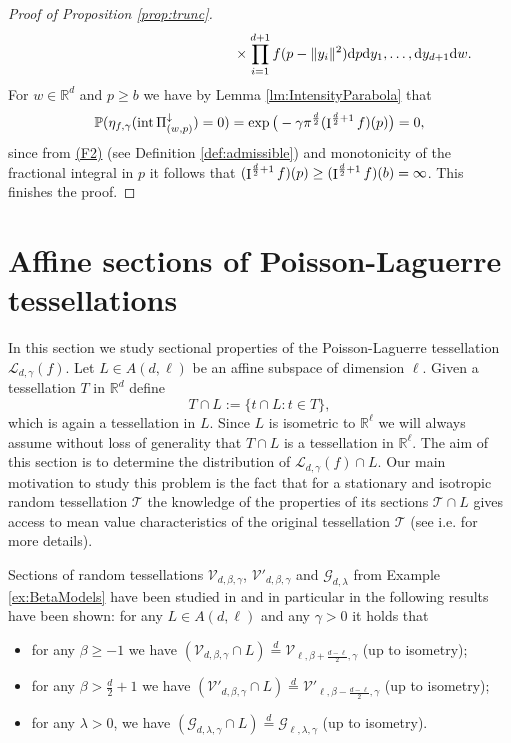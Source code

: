 \documentclass[11pt,a4paper]{article}
\theoremstyle{plain}
\theoremstyle{definition}
\theoremstyle{remark}
\def\PP{\mathbb{P}}
\def\RR{\mathbb{R}}
\def\cG{\mathcal{G}}
\def\cL{\mathcal{L}}
\def\cT{\mathcal{T}}
\def\cV{\mathcal{V}}
\newcommand{\dd}{{\rm d}}
\newcommand{\frI}{\mathop{\mathrm{I}}\nolimits}
\newcommand{\inter}{\operatorname{int}}
\begin{document}
\begin{proof}[Proof of Proposition \ref{prop:trunc}]
\begin{align*}
    &\hspace{5cm}\times\prod_{i=1}^{d+1}f(p-\|y_i\|^2)\dd p \dd y_1,\dots,\dd y_{d+1}\dd w.
\end{align*}
For $w\in \RR^d$ and $p\ge b$ we have by Lemma \ref{lm:IntensityParabola} that
\[
    \PP(\eta_{f,\gamma}(\inter\Pi^\downarrow_{(w,p)})=0)=\exp\big(-\gamma\pi^{d\over 2}(\frI^{{d\over 2}+1}f)(p)\big)=0,
\]
since from \hyperref[item:F2]{(F2)} (see Definition \ref{def:admissible}) and monotonicity of the fractional integral in $p$ it follows that $(\frI^{{d\over 2}+1}f)(p)\ge(\frI^{{d\over 2}+1}f)(b)= \infty$. This finishes the proof.
\end{proof}

\section{Affine sections of Poisson-Laguerre tessellations}\label{sec:sectional}

In this section we study sectional properties of the Poisson-Laguerre tessellation $\cL_{d,\gamma}(f)$. Let $L\in A(d,\ell)$ be an affine subspace of dimension $\ell$. Given a tessellation $T$ in $\RR^d$ define 
$$
T\cap L:=\{t\cap L\colon t\in T\},
$$
which is again a tessellation in $L$. Since $L$ is isometric to $\RR^{\ell}$ we will always assume without loss of generality that $T\cap L$ is a tessellation in $\RR^{\ell}$. The aim of this section is to determine the distribution of $\cL_{d,\gamma}(f)\cap L$. Our main motivation to study this problem is the fact that for a stationary and isotropic random tessellation $\cT$ the knowledge of the properties of its sections $\cT\cap L$  gives access to mean value characteristics of the original tessellation $\cT$ (see i.e. \cite[p. 466-467]{SW} for more details).

Sections of random tessellations $\cV_{d,\beta,\gamma}$, $\cV'_{d,\beta,\gamma}$ and $\cG_{d,\lambda}$ from Example \ref{ex:BetaModels} have been studied in \cite{sectional} and in particular in \cite[Theorem~4.1]{sectional} the following results have been shown: for any $L\in A(d,\ell)$ and any $\gamma>0$ it holds that
\begin{itemize}
	\item[(1)] for any $\beta\ge -1$ we have $(\cV_{d,\beta,\gamma}\cap 
 L)\overset{d}{=}\cV_{\ell,\beta+\frac{d-\ell}{2},\gamma}$  (up to isometry);
	\item[(2)]  for any  $\beta>\frac{d}2 + 1$ we have  $(\cV'_{d,\beta,\gamma}\cap L)\overset{d}{=}\cV'_{\ell,\beta-\frac{d-\ell}{2},\gamma}$  (up to isometry);
	\item[(3)]  for any  {$\lambda>0$,} we have  $(\cG_{d,\lambda,\gamma}\cap L)\overset{d}{=}\cG_{\ell,\lambda,\gamma}$  (up to isometry).
\end{itemize}
\end{document}
